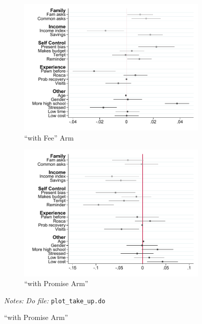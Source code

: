 \documentclass[11pt]{article}
\begin{document}
\begin{figure}[H]
    \caption{Voluntary take up of monthly payment}
    \label{interactions_takeup}
    \begin{center}
    \begin{subfigure}{0.8\textwidth}
        \caption{``with Fee'' Arm}
        \centering
        \includegraphics[width=\textwidth]{Figuras/pago_frec_vol_fee_interactions_rf.pdf}
    \end{subfigure}
    \begin{subfigure}{0.8\textwidth}
        \caption{``with Promise Arm''}
        \centering
        \includegraphics[width=\textwidth]{Figuras/pago_frec_vol_promise_interactions_rf.pdf}
    \end{subfigure}
    \end{center}
     \footnotesize \textit{Notes: } 
      \footnotesize{ \textit{Do file: }  \texttt{plot\_take\_up.do}}
\end{figure}
\end{document}
